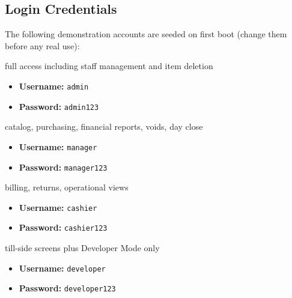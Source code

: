 \documentclass[12pt,a4paper]{report}
\begin{document}
\subsection{Login Credentials}
The following demonstration accounts are seeded on first boot (change them before any
real use):
\begin{description}[leftmargin=1.5em]
  \item[\textbf{Owner (admin):}] full access including staff management and item
        deletion
        \begin{itemize}
          \item \textbf{Username:} \texttt{admin}
          \item \textbf{Password:} \texttt{admin123}
        \end{itemize}
  \item[\textbf{Manager:}] catalog, purchasing, financial reports, voids, day close
        \begin{itemize}
          \item \textbf{Username:} \texttt{manager}
          \item \textbf{Password:} \texttt{manager123}
        \end{itemize}
  \item[\textbf{Cashier:}] billing, returns, operational views
        \begin{itemize}
          \item \textbf{Username:} \texttt{cashier}
          \item \textbf{Password:} \texttt{cashier123}
        \end{itemize}
  \item[\textbf{Developer:}] till-side screens plus Developer Mode only
        \begin{itemize}
          \item \textbf{Username:} \texttt{developer}
          \item \textbf{Password:} \texttt{developer123}
        \end{itemize}
\end{description}
\end{document}
